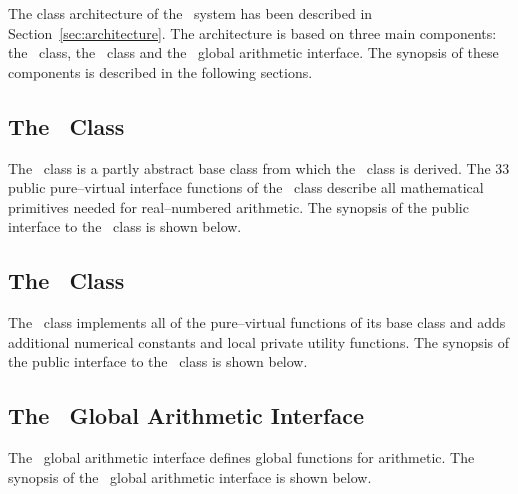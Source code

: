 The class architecture of the \efloat\ system has been described in
Section~\ref{sec:architecture}. The architecture is based on three main
components: the \efloatbaseclass\ class, the \efloatclass\ class and the
\efloatclass\ global arithmetic interface. The synopsis of these components is
described in the following sections.

\subsection{The \efloatbasehyperref\ Class}\label{subsec:efbaseclass}

The \efloatbaseclass\ class is a partly abstract base class from which the
\efloatclass\ class is derived. The $33$ public pure--virtual interface functions
of the \efloatbaseclass\ class describe all mathematical primitives needed
for real--numbered arithmetic.
The synopsis of the public interface to the \efloatbaseclass\ class is shown below.

\vspace{4.0pt}



\vspace{4.0pt}

\subsection{The \efloathyperref\ Class}\label{subsec:efclass}

The \efloatclass\ class implements all of the pure--virtual functions
of its base class and adds additional numerical constants and local
private utility functions.
The synopsis of the public interface to the \efloatclass\ class is shown below.

\vspace{4.0pt}



\vspace{4.0pt}

\subsection{The \efloathyperref\ Global Arithmetic Interface}

The \efloatclass\ global arithmetic interface defines global functions
for arithmetic.
The synopsis of the \efloatclass\ global arithmetic interface is shown below.

